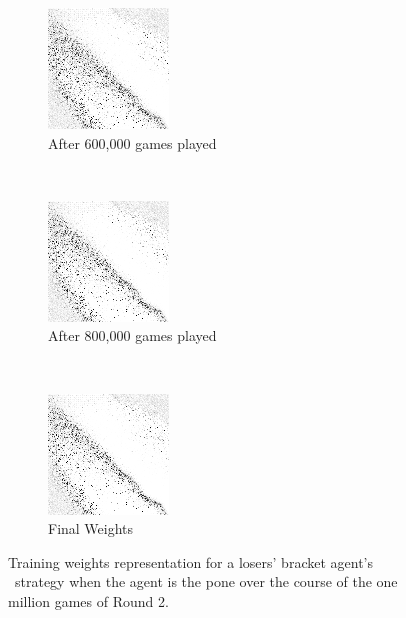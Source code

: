 \begin{figure}
	\begin{subfigure}[t]{0.3\textwidth}
	\centering
	\includegraphics[width=\stratgraphwidth]{images/findings/round2/flipbook/loser/checkpoint_600000.png}
	\caption{After 600,000 games played}
	\end{subfigure}
	~
	\begin{subfigure}[t]{0.3\textwidth}
	\centering
	\includegraphics[width=\stratgraphwidth]{images/findings/round2/flipbook/loser/checkpoint_800000.png}
	\caption{After 800,000 games played}
	\end{subfigure}
	~
	\begin{subfigure}[t]{0.3\textwidth}
	\centering
	\includegraphics[width=\stratgraphwidth]{images/findings/round2/flipbook/loser/checkpoint_999999.png}
	\caption{Final Weights}
	\end{subfigure}

\caption{
	Training weights representation for a losers' bracket agent's \handmaxavg\
	strategy when the agent is the pone
	over the course of the one million games of Round 2.
}
\label{fig:r2-flip-loser}
\end{figure}
